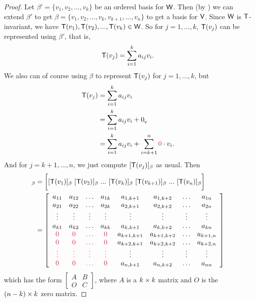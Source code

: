 \begin{proof}
Let \(\beta' = \{ v_1, v_2, ..., v_k \}\) be an ordered basis for \(\textsf{W}\).
Then (by ) we can extend \(\beta'\) to get \(\beta = \{ v_1, v_2, ..., v_k, v_{k + 1}, ..., v_n \}\) to get a basis for \(\textsf{V}\).
Since \(\textsf{W}\) is \(\textsf{T}\)-invariant, we have \(\textsf{T}(v_1), \textsf{T}(v_2), ..., \textsf{T}(v_k) \in \textsf{W}\).
So for \(j = 1, ..., k\), \(\textsf{T}(v_j)\) can be represented using \(\beta'\), that is,
\[
    \textsf{T}(v_j) = \sum_{i = 1}^k a_{ij} v_i.
\]
We also can of course using \(\beta\) to represent \(\textsf{T}(v_j)\) for \(j = 1, ..., k\), but
\begin{align*}
    \T(v_j) & = \sum_{i = 1}^k a_{ij} v_i \\
            & = \sum_{i = 1}^k a_{ij} v_i + \OV \\
            & = \sum_{i = 1}^k a_{ij} v_i + \sum_{i = k + 1}^n \RED{0} \cdot v_i.
\end{align*}
And for \(j = k + 1, ..., n\), we just compute \([\textsf{T}(v_j)]_{\beta}\) as usual.
Then
\begin{align*}
    [\T]_{\beta} & = \bigg[ [\T(v_1)]_{\beta} \ [\T(v_2)]_{\beta}\ ...\ [\T(v_k)]_{\beta}\ [\T(v_{k + 1})]_{\beta}\ ...\ [\T(v_n)]_{\beta} \bigg] \\
                 & =
    \left[\begin{array}{cccccccc}
        a_{11} & a_{12} & \ldots & a_{1k} & a_{1,k+1} & a_{1,k+2} & \ldots & a_{1n} \\
        a_{21} & a_{22} & \ldots & a_{2k} & a_{2,k+1} & a_{2,k+2} & \ldots & a_{2n} \\
        \vdots & \vdots & \vdots & \vdots & \vdots & \vdots & \vdots & \vdots \\
        a_{k 1} & a_{k 2} & \ldots & a_{kk} & a_{k,k+1} & a_{k,k+2} & \ldots & a_{kn} \\
        \RED{0} & \RED{0} & \RED{\ldots} & \RED{0} & a_{k+1,k+1} & a_{k+1,k+2} & \ldots & a_{k+1,n} \\
        \RED{0} & \RED{0} & \RED{\ldots} & \RED{0} & a_{k+2,k+1} & a_{k+2,k+2} & \ldots & a_{k+2,n} \\
        \RED{\vdots} & \RED{\vdots} & \RED{\vdots} & \RED{\vdots} & \vdots & \vdots & \vdots & \vdots \\
        \RED{0} & \RED{0} & \RED{\ldots} & \RED{0} & a_{n,k+1} & a_{n,k+2} & \ldots & a_{nn}
    \end{array}\right]
\end{align*}
which has the form
\(\left[\begin{array}{cc}
    A & B \\
    O & C
\end{array}\right]\), where \(A\) is a \(k \times k\) matrix and \(O\) is the \((n - k) \times k\) zero matrix.
\end{proof}

